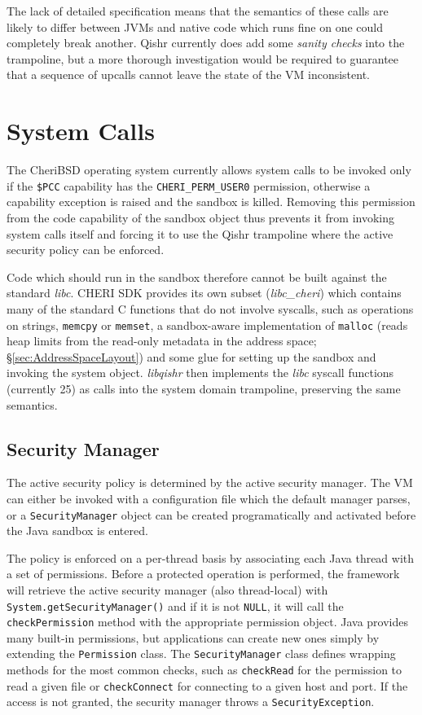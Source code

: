 \documentclass[a4paper,12pt,twoside,openright]{report}
\newcommand{\reg}[1]{\texttt{\$#1}}
\newcommand{\class}[1]{\texttt{#1}}
\newcommand{\tool}[1]{\emph{#1}}
\newcommand{\lib}[1]{\tool{lib#1}}
\begin{document}
The lack of detailed specification means that the semantics of these calls are likely to differ between JVMs and native code which runs fine on one could completely break another. Qishr currently does add some \emph{sanity checks} into the trampoline, but a more thorough investigation would be required to guarantee that a sequence of upcalls cannot leave the state of the VM inconsistent.

\section{System Calls}

The CheriBSD operating system currently allows system calls to be invoked only if the \reg{PCC} capability has the \texttt{CHERI\_PERM\_USER0} permission, otherwise a capability exception is raised and the sandbox is killed. Removing this permission from the code capability of the sandbox object thus prevents it from invoking system calls itself and forcing it to use the Qishr trampoline where the active security policy can be enforced.

Code which should run in the sandbox therefore cannot be built against the standard \lib{c}. CHERI SDK provides its own subset (\lib{c\_cheri}) which contains many of the standard C functions that do not involve syscalls, such as operations on strings, \texttt{memcpy} or \texttt{memset}, a sandbox-aware implementation of \texttt{malloc} (reads heap limits from the read-only metadata in the address space; \S\ref{sec:AddressSpaceLayout}) and some glue for setting up the sandbox and invoking the system object. \lib{qishr} then implements the \lib{c} syscall functions (currently 25) as calls into the system domain trampoline, preserving the same semantics.

\subsection{Security Manager}

The active security policy is determined by the active security manager. The VM can either be invoked with a configuration file which the default manager parses, or a \class{Security\-Manager} object can be created programatically and activated before the Java sandbox is entered.

The policy is enforced on a per-thread basis by associating each Java thread with a set of permissions. Before a protected operation is performed, the framework will retrieve the active security manager (also thread-local) with \texttt{System.{\allowbreak}getSecurityManager()} and if it is not \texttt{NULL}, it will call the \texttt{checkPermission} method with the appropriate permission object. Java provides many built-in permissions, but applications can create new ones simply by extending the \class{Permission} class. The \class{Security\-Manager} class defines wrapping methods for the most common checks, such as \texttt{checkRead} for the permission to read a given file or \texttt{checkConnect} for connecting to a given host and port. If the access is not granted, the security manager throws a \texttt{SecurityException}.
\end{document}
